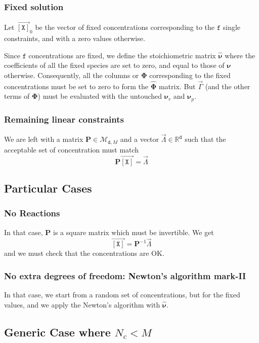 \documentclass[aps,twocolumn]{revtex4}
\newcommand{\myconc}[1]{\left\lbrack #1 \right\rbrack}
\newcommand{\mychem}[1]{{\mathtt{#1}}}
\newcommand{\mymat}[1]{\boldsymbol{#1}}
\newcommand{\myvec}[1]{\overrightarrow{#1}}
\newcommand{\vecX}{\myvec{\myconc{\mychem{X}}}}
\newcommand{\dof}{\mathtt{d}}
\newcommand{\fixed}{\mathtt{f}}
\begin{document}
\subsubsection{Fixed solution}
Let $\vecX_0$ be the vector of fixed concentrations corresponding to the $\fixed$ single constraints, and with
a zero values otherwise.
	
Since $\fixed$ concentrations are fixed, we define the stoichiometric matrix $\hat{\mymat{\nu}}$
where the coefficients of all the fixed species are set to zero, and equal to those of $\mymat{\nu}$ otherwise.
Consequently, all the columns or $\mymat{\Phi}$ corresponding to the fixed concentrations must 
be set to zero to form the $\hat{\mymat{\Phi}}$ matrix. 
But $\vec{\Gamma}$ (and the other terms of $\mymat{\Phi}$) must be evaluated with
the untouched $\mymat{\nu}_r$ and $\mymat{\nu}_p$.

\subsubsection{Remaining linear constraints}
We are left with a matrix $\mymat{P}\in\mathcal{M}_{\dof,M}$ and a vector $\vec{\Lambda}\in\mathbb{R}^{\dof}$ such
that the acceptable set of concentration must match
\begin{equation}
	\mymat{P}\vecX = \vec{\Lambda}
\end{equation}

\subsection{Particular Cases}
\subsubsection{No Reactions}
In that case, $\mymat{P}$ is a square matrix which must be invertible.
We get
$$
	\vecX = \mymat{P}^{-1}\vec{\Lambda}
$$
and we must check that the concentrations are OK.

\subsubsection{No extra degrees of freedom: Newton's algorithm mark-II}
In that case, we start from a random set of concentrations, but for the fixed values, and
we apply the Newton's algorithm with $\hat{\mymat{\nu}}$.

\subsection{Generic Case where $N_c<M$}
\end{document}
